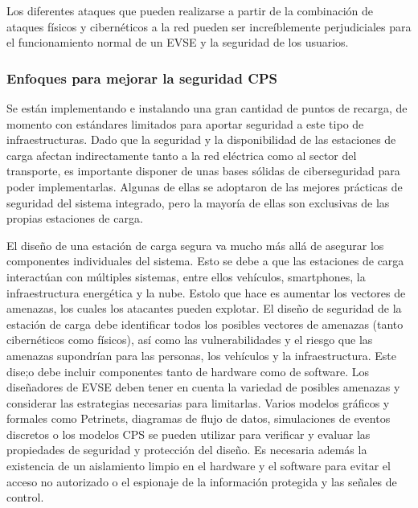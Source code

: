 \documentclass[12pt,a4paper,onecolumn,oneside]{report}
\newcounter{subsubsubsection}[subsubsection]
\begin{document}
Los diferentes ataques que pueden realizarse a partir de la combinación de ataques físicos y cibernéticos a la red pueden ser increíblemente perjudiciales para el funcionamiento normal de un EVSE y la seguridad de los usuarios.


\subsubsection{Enfoques para mejorar la seguridad CPS}
\label{Enfoques para mejorar la seguridad CPS}

Se están implementando e instalando una gran cantidad de puntos de recarga, de momento con estándares limitados para aportar seguridad a este tipo de infraestructuras. Dado que la seguridad y la disponibilidad de las estaciones de carga afectan indirectamente tanto a la red eléctrica como al sector del transporte, es importante disponer de unas bases sólidas de ciberseguridad para poder implementarlas. Algunas de ellas se adoptaron de las mejores prácticas de seguridad del sistema integrado, pero la mayoría de ellas son exclusivas de las propias estaciones de carga.


El diseño de una estación de carga segura va mucho más allá de asegurar los componentes individuales del sistema. Esto se debe a que las estaciones de carga interactúan con múltiples sistemas, entre ellos vehículos, smartphones, la infraestructura energética y la nube. Estolo que hace es aumentar los vectores de amenazas, los cuales los atacantes pueden explotar. El diseño de seguridad de la estación de carga debe identificar todos los posibles vectores de amenazas (tanto cibernéticos como físicos), así como las vulnerabilidades y el riesgo que las amenazas supondrían para las personas, los vehículos y la infraestructura. Este dise;o debe incluir componentes tanto de hardware como de software. Los diseñadores de EVSE deben tener en cuenta la variedad de posibles amenazas y considerar las estrategias necesarias para limitarlas. Varios modelos gráficos y formales como Petrinets, diagramas de flujo de datos, simulaciones de eventos discretos o los modelos CPS \cite{catorce}\cite{quince}\cite{dieciseis}\cite{diecisiete} se pueden utilizar para verificar y evaluar las propiedades de seguridad y protección del diseño. Es necesaria además la existencia de un aislamiento limpio en el hardware y el software para evitar el acceso no autorizado o el espionaje de la información protegida y las señales de control.
\end{document}
